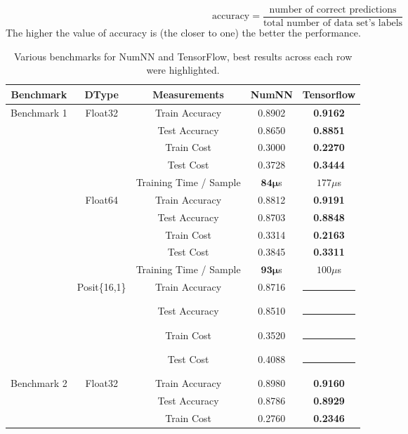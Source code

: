 \begin{equation}
\textrm{accuracy} = \frac{\textrm{number of correct predictions}}{\textrm{total number of data set's labels}}
\end{equation}\vspace{1ex} 
The higher the value of accuracy is (the closer to one) the better the performance.


\begin{table}[!htbp]
	\centering
	\renewcommand{\arraystretch}{1.05}
	\caption{Various benchmarks for NumNN and TensorFlow, best results across each row were highlighted.}\label{tab:bench}
	\begin{tabular}{|c | c | c || c | c |}
		\hline
		Benchmark & DType & Measurements & NumNN & Tensorflow\\\hline\hline
		\multirow{14}{*}{Benchmark 1} & \multirow{5}{*}{Float32} & Train Accuracy & 0.8902 & \textbf{0.9162}\\
		& & Test Accuracy & 0.8650 & \textbf{0.8851}\\
		& & Train Cost & 0.3000 & \textbf{0.2270}\\
		& & Test Cost & 0.3728 & \textbf{0.3444}\\
		& & Training Time / Sample & \textbf{$\mathbf{84\mu}$}s  & $177\mu$s\\\cline{2-5}
		& \multirow{5}{*}{Float64} & Train Accuracy & 0.8812 & \textbf{0.9191} \\
		& & Test Accuracy & 0.8703 & \textbf{0.8848} \\
		& & Train Cost & 0.3314 & \textbf{0.2163} \\
		& & Test Cost & 0.3845 & \textbf{0.3311} \\
		& & Training Time / Sample & \textbf{$\mathbf{93\mu}$}s & $100\mu$s\\\cline{2-5}
		& \multirow{4}{*}{Posit\{16,1\}} & Train Accuracy & 0.8716 & \rule{5em}{1pt} \\
		& & Test Accuracy & 0.8510 & \rule{5em}{1pt} \\
		& & Train Cost & 0.3520 & \rule{5em}{1pt} \\
		& & Test Cost & 0.4088 & \rule{5em}{1pt} \\\hline
		\multirow{14}{*}{Benchmark 2%
		} & \multirow{5}{*}{Float32} & Train Accuracy & 0.8980 & \textbf{0.9160}\\
		& & Test Accuracy & 0.8786 & \textbf{0.8929}\\
		& & Train Cost & 0.2760 & \textbf{0.2346}\\

\end{tabular}
\end{table}
